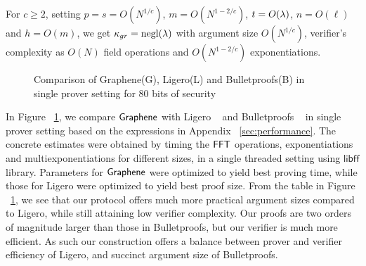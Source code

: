 For $c\geq 2$, setting $p=s=O(N^{1/c})$, $m=O(N^{1-2/c})$, $t=O(\lambda)$,
$n=O(\ell)$ and $h=O(m)$, we get $\kappa_{gr}=\mathrm{negl}(\lambda)$ with argument size
$O(N^{1/c})$, verifier's complexity as $O(N)$ field operations and
$O(N^{1-2/c})$ exponentiations. 

\begin{figure}[!]
\centering
{}
\caption{Comparison of Graphene(G), Ligero(L) and Bulletproofs(B) in single
prover setting for 80 bits of security}
\label{fig:standalonecompare}
\end{figure}


In Figure ~\ref{fig:standalonecompare}, we compare
$\textsf{Graphene}$ with Ligero ~\cite{ligero} and Bulletproofs ~\cite{bulletproofs} in
single prover setting based on the expressions in Appendix
~\ref{sec:performance}. The concrete estimates were obtained by timing the $\mathsf{FFT}$
operations, exponentiations and multiexponentiations for different sizes, in a
single threaded setting using $\mathsf{libff}$ library. Parameters for $\textsf{Graphene}$ were optimized to yield best
proving time, while those for Ligero were optimized to yield best proof size.
From the table in Figure ~\ref{fig:standalonecompare}, we see that our protocol offers much more practical argument
sizes compared to Ligero, while still attaining low verifier complexity. Our
proofs are two orders of magnitude larger than those in Bulletproofs, but our
verifier is much more efficient. 
As such our construction offers a balance
between prover and verifier efficiency of Ligero, and succinct argument size of
Bulletproofs. 


